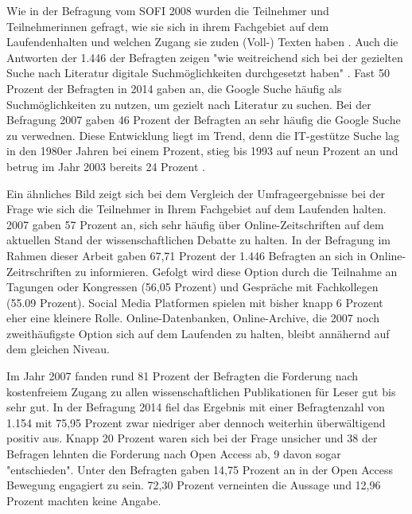 Wie in der Befragung vom SOFI 2008 wurden die Teilnehmer und Teilnehmerinnen gefragt, wie sie sich in ihrem Fachgebiet auf dem Laufendenhalten und welchen Zugang sie zuden (Voll-) Texten haben \cite{hanekop_2008}. Auch die Antworten der 1.446 der Befragten zeigen "wie weitreichend sich bei der gezielten Suche nach Literatur digitale Suchmöglichkeiten durchgesetzt haben" \cite{hanekop_2008}. Fast 50 Prozent der Befragten in 2014 gaben an, die Google Suche häufig als Suchmöglichkeiten zu nutzen, um gezielt nach Literatur zu suchen. Bei der Befragung 2007 gaben 46 Prozent der Befragten an sehr häufig die Google Suche zu verwednen. Diese Entwicklung liegt im Trend, denn die IT-gestütze Suche lag in den 1980er Jahren bei einem Prozent, stieg bis 1993 auf neun Prozent an und betrug im Jahr 2003 bereits 24 Prozent \cite{hanekop_2008}.


Ein ähnliches Bild zeigt sich bei dem Vergleich der Umfrageergebnisse bei der Frage wie sich die Teilnehmer in Ihrem Fachgebiet auf dem Laufenden halten. 2007 gaben 57 Prozent an, sich sehr häufig über Online-Zeitschriften auf dem aktuellen Stand der wissenschaftlichen Debatte zu halten. In der Befragung im Rahmen dieser Arbeit gaben 67,71 Prozent der 1.446 Befragten an sich in Online-Zeitrschriften zu informieren. Gefolgt wird diese Option durch die Teilnahme an Tagungen oder Kongressen (56,05 Prozent) und Gespräche mit Fachkollegen (55.09 Prozent). Social Media Platformen spielen mit bisher knapp 6 Prozent eher eine kleinere Rolle. Online-Datenbanken, Online-Archive, die 2007 noch zweithäufigste Option sich auf dem Laufenden zu halten, bleibt annähernd auf dem gleichen Niveau.

Im Jahr 2007 fanden rund 81 Prozent der Befragten die Forderung nach kostenfreiem Zugang zu allen wissenschaftlichen Publikationen für Leser gut bis sehr gut. In der Befragung 2014 fiel das Ergebnis mit einer Befragtenzahl von 1.154 mit 75,95 Prozent zwar niedriger aber dennoch weiterhin überwältigend positiv aus. Knapp 20 Prozent waren sich bei der Frage unsicher und 38 der Befragen lehnten die Forderung nach Open Access ab, 9 davon sogar "entschieden". Unter den Befragten gaben 14,75 Prozent an in der Open Access Bewegung engagiert zu sein. 72,30 Prozent verneinten die Aussage und 12,96 Prozent machten keine Angabe.